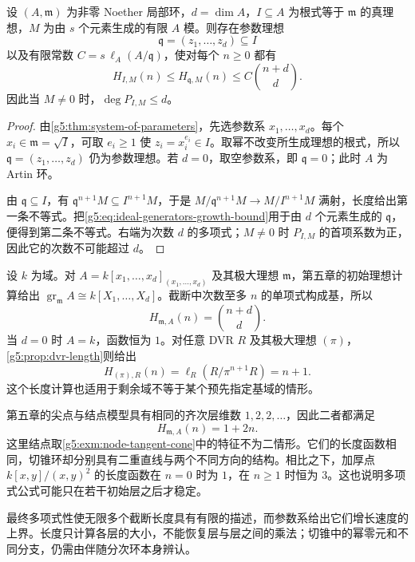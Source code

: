 \begin{proposition}\label{g5:prop:parameter-growth-bound}
	设 \((A,\mathfrak m)\) 为非零 Noether 局部环，\(d=\dim A\)，\(I\subseteq A\) 为根式等于 \(\mathfrak m\) 的真理想，\(M\) 为由 \(s\) 个元素生成的有限 \(A\) 模。则存在参数理想
	\[
		\mathfrak q=(z_1,\ldots,z_d)\subseteq I
	\]
	以及有限常数 \(C=s\,\ell_A(A/\mathfrak q)\)，使对每个 \(n\geq0\) 都有
	\[
		H_{I,M}(n)\leq H_{\mathfrak q,M}(n)
		\leq C\binom{n+d}{d}.
	\]
	因此当 \(M\ne0\) 时，\(\deg P_{I,M}\leq d\)。
\end{proposition}
\begin{proof}
	由\cref{g5:thm:system-of-parameters}，先选参数系 \(x_1,\ldots,x_d\)。每个 \(x_i\in\mathfrak m=\sqrt I\)，可取 \(e_i\geq1\) 使 \(z_i=x_i^{e_i}\in I\)。取幂不改变所生成理想的根式，所以 \(\mathfrak q=(z_1,\ldots,z_d)\) 仍为参数理想。若 \(d=0\)，取空参数系，即 \(\mathfrak q=0\)；此时 \(A\) 为 Artin 环。

	由 \(\mathfrak q\subseteq I\)，有 \(\mathfrak q^{n+1}M\subseteq I^{n+1}M\)，于是
	\(M/\mathfrak q^{n+1}M\to M/I^{n+1}M\) 满射，长度给出第一条不等式。把\eqref{g5:eq:ideal-generators-growth-bound}用于由 \(d\) 个元素生成的 \(\mathfrak q\)，便得到第二条不等式。右端为次数 \(d\) 的多项式；\(M\ne0\) 时 \(P_{I,M}\) 的首项系数为正，因此它的次数不可能超过 \(d\)。
\end{proof}

\begin{example}\label{g5:exm:hilbert-samuel-basic-models}
	设 \(k\) 为域。对 \(A=k[x_1,\ldots,x_d]_{(x_1,\ldots,x_d)}\) 及其极大理想 \(\mathfrak m\)，第五章的初始理想计算给出
	\(\operatorname{gr}_{\mathfrak m}A\cong k[X_1,\ldots,X_d]\)。截断中次数至多 \(n\) 的单项式构成基，所以
	\[
		H_{\mathfrak m,A}(n)=\binom{n+d}{d}.
	\]
	当 \(d=0\) 时 \(A=k\)，函数恒为 \(1\)。对任意 DVR \(R\) 及其极大理想 \((\pi)\)，\cref{g5:prop:dvr-length}则给出
	\[
		H_{(\pi),R}(n)=\ell_R(R/\pi^{n+1}R)=n+1.
	\]
	这个长度计算也适用于剩余域不等于某个预先指定基域的情形。

	第五章的尖点与结点模型具有相同的齐次层维数 \(1,2,2,\ldots\)，因此二者都满足
	\[
		H_{\mathfrak m,A}(n)=1+2n.
	\]
	这里结点取\cref{g5:exm:node-tangent-cone}中的特征不为二情形。它们的长度函数相同，切锥环却分别具有二重直线与两个不同方向的结构。相比之下，加厚点 \(k[x,y]/(x,y)^2\) 的长度函数在 \(n=0\) 时为 \(1\)，在 \(n\geq1\) 时恒为 \(3\)。这也说明多项式公式可能只在若干初始层之后才稳定。
\end{example}

最终多项式性使无限多个截断长度具有有限的描述，而参数系给出它们增长速度的上界。长度只计算各层的大小，不能恢复层与层之间的乘法；切锥中的幂零元和不同分支，仍需由伴随分次环本身辨认。
